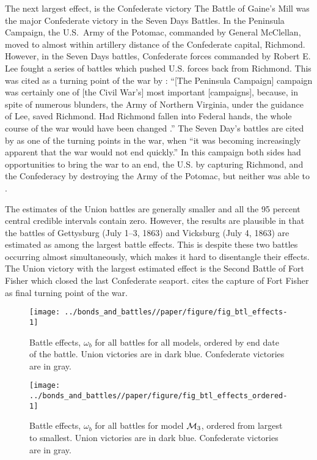 The next largest effect, is the Confederate victory The Battle of Gaine's Mill was the major Confederate victory in the Seven Days Battles.
In the Peninsula Campaign, the U.S.\ Army of the Potomac, commanded by General McClellan, moved to almost within artillery distance of the Confederate capital, Richmond.
However, in the Seven Days battles, Confederate forces commanded by Robert E. Lee fought a series of battles which pushed U.S. forces back from Richmond.
This was cited as a turning point of the war by \textcite{Fuller1942a}: ``[The Peninsula Campaign] campaign was certainly one of [the Civil War's] most important [campaigns], because, in spite of numerous blunders, the Army of Northern Virginia, under the guidance of Lee, saved Richmond. Had Richmond fallen into Federal hands, the whole course of the war would have been changed \parencite[206]{Fuller1942a}.''
The Seven Day's battles are cited by \textcite[145]{Reiter2009} as one of the turning points in the war, when ``it was becoming increasingly apparent that the war would not end quickly.''
In this campaign both sides had opportunities to bring the war to an end, the U.S.  by capturing Richmond, and the Confederacy by destroying the Army of the Potomac, but neither was able to \parencite[Chapter6]{Fuller1942a}. 

The estimates of the Union battles are generally smaller and all the 95 percent central credible intervals contain zero.
However, the results are plausible in that the battles of Gettysburg (July 1--3, 1863) and Vicksburg (July 4, 1863) are estimated as among the largest battle effects.
This is despite these two battles occurring almost simultaneously, which makes it hard to disentangle their effects.
The Union victory with the largest estimated effect is the Second Battle of Fort Fisher which closed the last Confederate seaport. 
\textcite[154]{Reiter2009} cites the capture of  Fort Fisher as final turning point of the war.

\begin{figure}[!htpb]
  \centering
  \texttt{[image: ../bonds\_and\_battles//paper/figure/fig\_btl\_effects-1]}
  \caption[Battle Effects on log-yields for all models]{Battle effects, $\omega_{b}$ for all battles for all models, ordered by end date of the battle.
    Union victories are in dark blue. Confederate victories are in gray.
  }
  \label{bonds:fig:btl_effects}
\end{figure}

\begin{figure}[!htpb]
  \centering
  \texttt{[image: ../bonds\_and\_battles//paper/figure/fig\_btl\_effects\_ordered-1]}  
  \caption[Battle effects for model $\Model{3}$, ordered by magnitude]{
    Battle effects, $\omega_{b}$ for all battles for model $\Model{3}$, ordered from largest to smallest.
    Union victories are in dark blue. Confederate victories are in gray.
  }
  \label{bonds:fig:btl_effects_ordered}
\end{figure}

